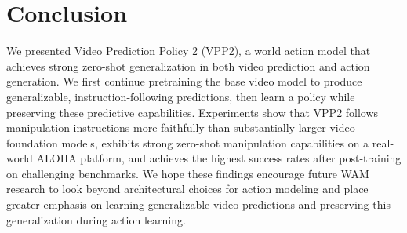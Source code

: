 \documentclass{article} %
\begin{document}
\begin{abstract}
\end{abstract}









\vspace{-1mm}
\section{Conclusion}
\vspace{-1mm}
We presented Video Prediction Policy 2 (VPP2), a world action model that achieves strong zero-shot generalization in both video prediction and action generation. We first continue pretraining the base video model to produce generalizable, instruction-following predictions, then learn a policy while preserving these predictive capabilities. Experiments show that VPP2 follows manipulation instructions more faithfully than substantially larger video foundation models, exhibits strong zero-shot manipulation capabilities on a real-world ALOHA platform, and achieves the highest success rates after post-training on challenging benchmarks. We hope these findings encourage future WAM research to look beyond architectural choices for action modeling and place greater emphasis on learning generalizable video predictions and preserving this generalization during action learning.
\end{document}

